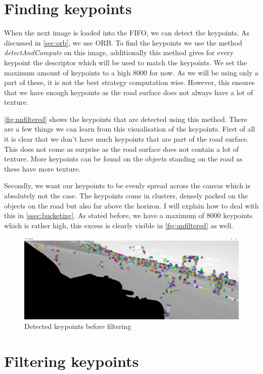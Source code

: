 \section{Finding keypoints}
When the next image is loaded into the FIFO, we can detect the keypoints. As discussed in \autoref{sec:orb}, we use ORB. To find the keypoints we use the method \textit{detectAndCompute} on this image, additionally this method gives for every keypoint the descriptor which will be used to match the keypoints. We set the maximum amount of keypoints to a high 8000 for now. As we will be using only a part of these, it is not the best strategy computation wise. However, this ensures that we have enough keypoints as the road surface does not always have a lot of texture. \bigskip

\autoref{fig:unfiltered} shows the keypoints that are detected using this method. There are a few things we can learn from this visualisation of the keypoints. First of all it is clear that we don't have much keypoints that are part of the road surface. This does not come as surprise as the road surface does not contain a lot of texture. More keypoints can be found on the objects standing on the road as these have more texture.\bigskip

Secondly, we want our keypoints to be evenly spread across the canvas which is absolutely not the case. The keypoints come in clusters, densely packed on the objects on the road but also far above the horizon. I will explain how to deal with this in \autoref{ssec:bucketing}. As stated before, we have a maximum of 8000 keypoints which is rather high, this excess is clearly visible in \autoref{fig:unfiltered} as well.

\begin{figure}
    \centering
    \includegraphics[width=1\textwidth]{figures/Unfiltered_keypoints.png}
    \caption{Detected keypoints before filtering}
    \label{fig:unfiltered}
\end{figure}

\section{Filtering keypoints}\label{sec:filtering}

